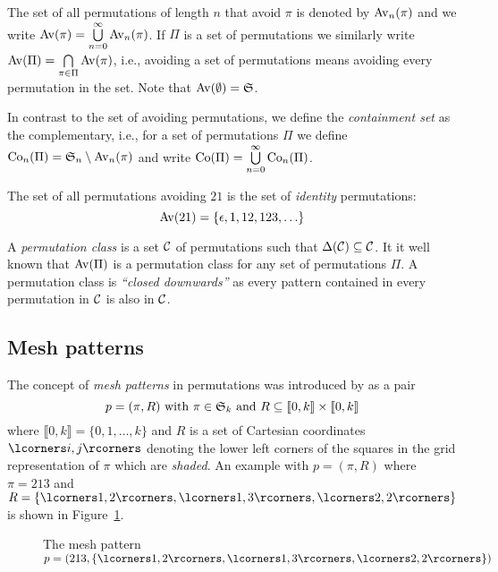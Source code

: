 The set of all permutations of length $n$ that avoid $\pi$ is denoted by 
$\Avn{\pi}$ and we write $\Av{\pi} = \bigcup\limits_{n=0}^{\infty}\Avn{\pi}$. 
If $\Pi$ is a set of permutations we similarly write $\Av{\Pi} = 
\bigcap\limits_{\pi \in \Pi}\Av{\pi}$, i.e., avoiding a set of permutations 
means avoiding every permutation in the set. Note that $\Av{\emptyset} = \S$.

In contrast to the set of avoiding permutations, we define the 
\emph{containment set} as the complementary, i.e., for a set of permutations 
$\Pi$ we define $\Con{\Pi} = \S_n \setminus \Avn{\pi}$ and write $\Co{\Pi} = 
\bigcup\limits_{n=0}^{\infty}\Con{\Pi}$.

\begin{example}
  The set of all permutations avoiding $21$ is the set of \emph{identity} 
  permutations: \[ \Av{21} = \left\{ \epsilon, 1, 12, 123, \ldots \right\} \]
\end{example}

A \emph{permutation class} is a set $\mc{C}$ of permutations such that 
$\Delta(\mc{C}) \subseteq \mc{C}$. It it well known that $\Av{\Pi}$ is a 
permutation class for any set of permutations $\Pi$. A permutation class is 
\emph{``closed downwards''} as every pattern contained in every permutation in 
$\mc{C}$ is also in $\mc{C}$.


\subsection{Mesh patterns\label{mesh patterns background}}

The concept of \emph{mesh patterns} in permutations was introduced by 
\textcite{branden_mesh_2011} as a pair
\[p = (\pi, R) \text{ with } \pi \in \S_k \text{ and } R \subseteq \llbracket 
0, k \rrbracket \times \llbracket 0, k \rrbracket \] where $\llbracket 0, k 
\rrbracket = \{0, 1, \ldots, k\}$ and $R$ is a set of Cartesian coordinates 
$\boks{i, j}$ denoting the lower left corners of the squares in the grid 
representation of $\pi$ which are \emph{shaded}. An example with $p = (\pi, R)$ 
where $\pi = 213$ and $R = \left\{ \boks{1,2}, \boks{1,3}, \boks{2,2} \right\}$ 
is shown in Figure~\ref{figure: Gr(213, shading)}.

\begin{figure}[htbp]
  \center
  \caption{The mesh pattern $p = \left(213, \left\{ \boks{1,2}, \boks{1,3}, \boks{2,2} \right\} \right)$}
  \label{figure: Gr(213, shading)}
\end{figure}

